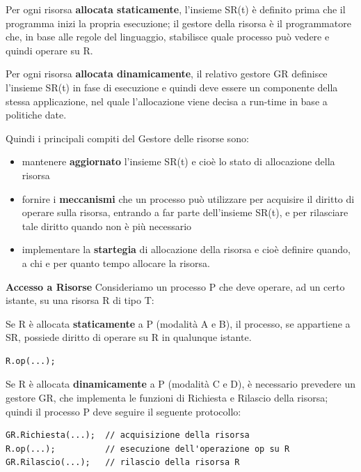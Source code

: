 \documentclass{article}
\begin{document}
Per ogni risorsa \textbf{allocata staticamente}, l'insieme SR(t) è definito prima che il programma inizi la propria esecuzione; il gestore della risorsa è il programmatore che,
in base alle regole del linguaggio, stabilisce quale processo può vedere e quindi operare su R.


Per ogni risorsa \textbf{allocata dinamicamente}, il relativo gestore GR definisce l'insieme SR(t) in fase di esecuzione e quindi deve essere un componente della stessa applicazione,
nel quale l'allocazione viene decisa a run-time in base a politiche date.

\vspace{5mm}
Quindi i principali compiti del Gestore delle risorse sono:
\begin{itemize}
    \item mantenere \textbf{aggiornato} l'insieme SR(t) e cioè lo stato di allocazione della risorsa
    \item fornire i \textbf{meccanismi} che un processo può utilizzare per acquisire il diritto di operare sulla risorsa, entrando a far parte dell'insieme SR(t), e per rilasciare
    tale diritto quando non è più necessario
    \item implementare la \textbf{startegia} di allocazione della risorsa e cioè definire quando, a chi e per quanto tempo allocare la risorsa.
\end{itemize}

\vspace{5mm}
{\large \textbf{Accesso a Risorse}}
Consideriamo un processo P che deve operare, ad un certo istante, su una risorsa R di tipo T:

Se R è allocata \textbf{staticamente} a P (modalità A e B), il processo, se appartiene a SR, possiede diritto di operare su R in qualunque istante.
\vspace{3mm}
\begin{lstlisting}
R.op(...);
\end{lstlisting}

Se R è allocata \textbf{dinamicamente} a P (modalità C e D), è necessario prevedere un gestore GR, che implementa le funzioni di Richiesta e Rilascio della risorsa; quindi il
processo P deve seguire il seguente protocollo:

\vspace{3mm}
\begin{lstlisting}
GR.Richiesta(...);  // acquisizione della risorsa
R.op(...);          // esecuzione dell'operazione op su R
GR.Rilascio(...);   // rilascio della risorsa R
\end{lstlisting}
\end{document}
